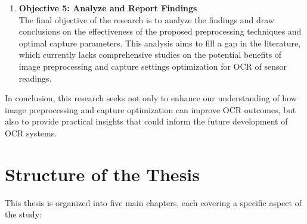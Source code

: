 \begin{enumerate}
    \item \textbf{Objective 5: Analyze and Report Findings}\\
          The final objective of the research is to analyze the findings and draw conclusions on the effectiveness of the proposed preprocessing techniques and optimal capture parameters. This analysis aims to fill a gap in the literature, which currently lacks comprehensive studies on the potential benefits of image preprocessing and capture settings optimization for OCR of sensor readings.
\end{enumerate}

In conclusion, this research seeks not only to enhance our understanding of how image preprocessing and capture optimization can improve OCR outcomes, but also to provide practical insights that could inform the future development of OCR systems.

\newpage

\section{Structure of the Thesis}

This thesis is organized into five main chapters, each covering a specific aspect of the study:

